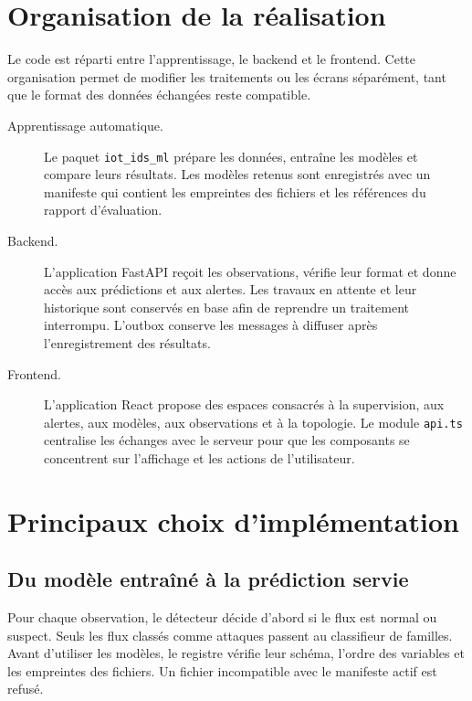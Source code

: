 \endgroup

\section{Organisation de la r\'ealisation}

Le code est réparti entre l'apprentissage, le backend et le frontend. Cette
organisation permet de modifier les traitements ou les écrans séparément,
tant que le format des données échangées reste compatible.

\begin{description}
  \item[Apprentissage automatique.] Le paquet \texttt{iot\_ids\_ml} prépare
  les données, entraîne les modèles et compare leurs résultats. Les modèles
  retenus sont enregistrés avec un manifeste qui contient les empreintes des
  fichiers et les références du rapport d'évaluation.

  \item[Backend.] L'application FastAPI reçoit les observations, vérifie
  leur format et donne accès aux prédictions et aux alertes. Les travaux en
  attente et leur historique sont conservés en base afin de reprendre un
  traitement interrompu. L'outbox conserve les messages à diffuser après
  l'enregistrement des résultats.

  \item[Frontend.] L'application React propose des espaces consacrés à la
  supervision, aux alertes, aux modèles, aux observations et à la topologie.
  Le module \texttt{api.ts} centralise les échanges avec le serveur pour que
  les composants se concentrent sur l'affichage et les actions de l'utilisateur.
\end{description}

\section{Principaux choix d'impl\'ementation}

\subsection{Du modèle entraîné à la prédiction servie}

Pour chaque observation, le détecteur décide d'abord si le flux est normal
ou suspect. Seuls les flux classés comme attaques passent au classifieur de
familles. Avant d'utiliser les modèles, le registre vérifie leur schéma,
l'ordre des variables et les empreintes des fichiers. Un fichier incompatible
avec le manifeste actif est refusé.


